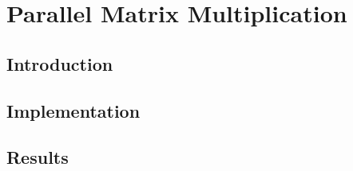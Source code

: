 \chapter{Parallel Matrix Multiplication}
\label{chap:matrix}
\section{Introduction}
\section{Implementation}
\section{Results}

